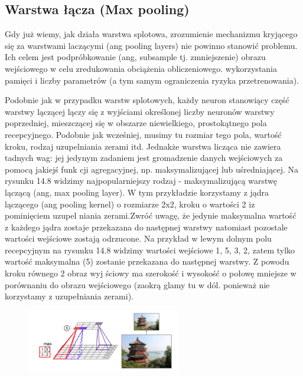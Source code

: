 \documentclass{article}
\begin{document}
\subsection{Warstwa łącza (Max pooling)}
Gdy już wiemy, jak działa warstwa splotowa, zrozumienie mechanizmu kryjącego się za warstwami laczącymi (ang pooling layers) nie powinno stanowić problemu. Ich celem jest podpróbkowanie (ang, subsample tj. zmniejszenie) obrazu wejściowego w celu zredukowania obciążenia obliczeniowego. wykorzystania pamięci i liczby parametrów (a tym samym ograniczenia ryzyka przetrenowania). \cite{geron}

Podobnie jak w przypadku warstw splotowych, każdy neuron stanowiący część warstwy lączącej lączy się z wyjściami określonej liczby neuronów warstwy poprzedniej, mieszczącej się w obszarze niewielkiego, prostokątnego pola recepcyjnego. Podobnie jak wcześniej, musimy tu rozmiar tego pola, wartość kroku, rodzaj uzupelniania zerami itd. Jednakże warstwa licząca nie zawiera tadnych wag: jej jedynym zadaniem jest gromadzenie danych wejściowych za pomocą jakiejś funk cji agregacyjnej, np. maksymalizującej lub uśredniającej. Na rysunku 14.8 widzimy najpopularniejszy rodzaj - maksymalizującą warstwę lączącą (ang, max pooling layer). W tym przykładzie korzystamy z jądra lączącego (ang pooling kernel) o rozmiarze 2x2, kroku o wartości 2 iz pominięciem uzupel niania zerami.Zwróć uwagę, że jedynie maksymalna wartość z każdego jądra zostaje przekazana do następnej warstwy natomiast pozostale wartości wejściowe zostają odrzucone. Na przykład w lewym dolnym polu recepcyjnym na rysunku 14.8 widzimy wartości wejściowe 1, 5, 3, 2, zatem tylko wartość maksymalna (5) zostanie przekazana do następnej warstwy. Z powodu kroku równego 2 obraz wyj ściowy ma szerokość i wysokość o połowę mniejsze w porównaniu do obrazu wejściowego (zaokrą glamy tu w dól. ponieważ nie korzystamy z uzupełniania zerami). \cite{geron}

\begin{figure}[H]
	\centering
	\includegraphics[width=0.6\textwidth,keepaspectratio=true]{max_pooling}
	\caption{}
\end{figure}
\end{document}
